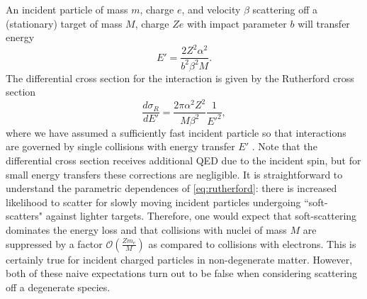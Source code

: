 \documentclass[twocolumn,showpacs,preprintnumbers,amsmath,amssymb,prd]{revtex4}
\newcommand{\OO}{\mathcal{O}}
\def\r{\right)}
\def\l{\left(}
\begin{document}
\begin{appendices}
An incident particle of mass $m$, charge $e$, and velocity $\beta$ scattering off a (stationary) target of mass $M$, charge $Ze$ with impact parameter $b$ will transfer energy 
\begin{equation}
\label{eq:impact}
E' = \frac{2 Z^2 \alpha^2}{b^2 \beta ^2 M}.
\end{equation}
The differential cross section for the interaction is given by the Rutherford cross section
\begin{equation}
\label{eq:rutherford}
\frac{d \sigma_R}{dE'} = \frac{2 \pi  \alpha^2 Z^2}{M \beta^2} \frac{1}{E'^2},
 \end{equation}
where we have assumed a sufficiently fast incident particle so that interactions are governed by single collisions with energy transfer $E'$ \cite{Agashe:2014kda}.  Note that the differential cross section receives additional QED due to the incident spin, but for small energy transfers these corrections are negligible. It is straightforward to understand the parametric dependences of \eqref{eq:rutherford}: there is increased likelihood to scatter for slowly moving incident particles undergoing ``soft-scatters" against lighter targets. Therefore, one would expect that soft-scattering dominates the energy loss and that collisions with nuclei of mass $M$ are suppressed by a factor $\OO\l\frac{Z m_e}{M}\r$ as compared to collisions with electrons. This is certainly true for incident charged particles in non-degenerate matter. However, both of these naive expectations turn out to be false when considering scattering off a degenerate species.


\end{appendices}
\end{document}
